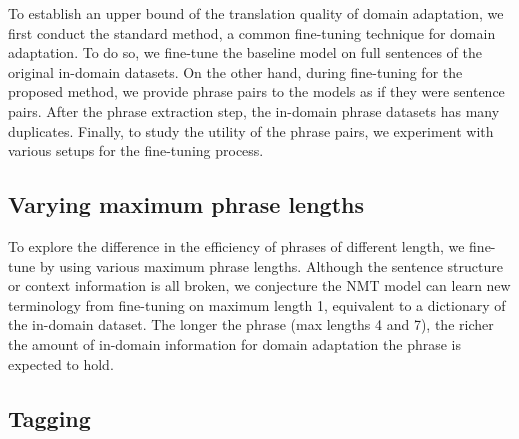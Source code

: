 To establish an upper bound of the translation quality of domain adaptation, we first conduct the standard method, a common fine-tuning technique for domain adaptation. To do so, we fine-tune the baseline model on full sentences of the original in-domain datasets. 
On the other hand, during fine-tuning for the proposed method, we provide phrase pairs to the models as if they were sentence pairs. After the phrase extraction step, the in-domain phrase datasets has many duplicates.
Finally, to study the utility of the phrase pairs, we experiment with various setups for the fine-tuning process. 


\subsection{Varying maximum phrase lengths}

To explore the difference in the efficiency of phrases of different length, we fine-tune by using various maximum phrase lengths. Although the sentence structure or context information is all broken, we conjecture the NMT model can learn new terminology from fine-tuning on maximum length 1, equivalent to a dictionary of the in-domain dataset. The longer the phrase (max lengths 4 and 7), the richer the amount of in-domain information for domain adaptation the phrase is expected to hold.

\subsection{Tagging}

